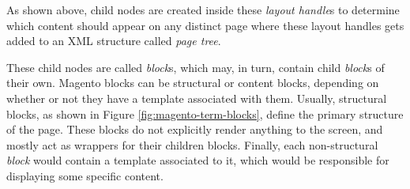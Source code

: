 As shown above, child nodes are created inside these \textit{layout handle}s to determine which content should appear on any distinct page where these layout handles gets added to an XML structure called \textit{page tree}.

These child nodes are called \textit{block}s, which may, in turn, contain child \textit{block}s of their own. 
Magento blocks can be structural or content blocks, depending on whether or not they have a template associated with them.
Usually, structural blocks, as shown in Figure \ref{fig:magento-term-blocks}, define the primary structure of the page. These blocks do not explicitly render anything to the screen, and mostly act as wrappers for their children blocks.
Finally, each non-structural \textit{block} would contain a template associated to it, which would be responsible for displaying some specific content.

